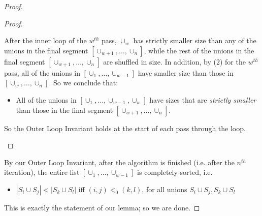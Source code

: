 \documentclass[12pt]{article}
\begin{document}
\begin{proof}
\begin{proof}
\begin{itemize}
After the inner loop of the $w^{th}$ pass, $\cup_w$ has strictly smaller size than any of the unions in the final segment $[\cup_{w+1}, \ldots, \cup_n]$, while the rest of the unions in the final segment $[\cup_{w+1}, \ldots, \cup_n]$ are shuffled in size.  In addition, by (2) for the $w^{th}$ pass, all of the unions in $[\cup_1, \ldots, \cup_{w-1}]$ have smaller size than those in $[\cup_w, \ldots, \cup_n]$.  So we conclude that:

\begin{itemize}
    \item All of the unions in $[\cup_1, \ldots, \cup_{w-1}, \cup_{w}]$ have sizes that are \textit{strictly smaller} than those in the final segment $[\cup_{w+1}, \ldots, \cup_n]$.
\end{itemize}

So the Outer Loop Invariant holds at the start of each pass through the loop.

\end{itemize}

\end{proof}

By our Outer Loop Invariant, after the algorithm is finished (i.e. after the $n^{th}$ iteration), the entire list $[\cup_1, \ldots, \cup_{w-1}]$ is completely sorted, i.e.

\begin{itemize}
    \item $|S_i \cup S_j| < |S_k \cup S_l|$ iff $(i, j) <_0 (k, l)$, for all unions $S_i \cup S_j, S_k \cup S_l$
\end{itemize}

This is exactly the statement of our lemma; so we are done.

\end{proof}
\end{document}
